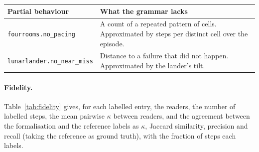 \begin{center}\footnotesize\begin{tabular}{@{}l>{\raggedright\arraybackslash}p{7.4cm}@{}}\toprule
Partial behaviour & What the grammar lacks \\ \midrule
\texttt{fourrooms.no\_pacing} & A count of a repeated pattern of cells. Approximated by steps per distinct cell over the episode. \\
\texttt{lunarlander.no\_near\_miss} & Distance to a failure that did not happen. Approximated by the lander's tilt. \\
\bottomrule\end{tabular}\end{center}

\paragraph{Fidelity.}
Table~\ref{tab:fidelity} gives, for each labelled entry, the readers, the number of labelled steps, the mean pairwise $\kappa$ between readers, and the agreement between the formalisation and the reference labels as $\kappa$, Jaccard similarity, precision and recall (taking the reference as ground truth), with the fraction of steps each labels.

